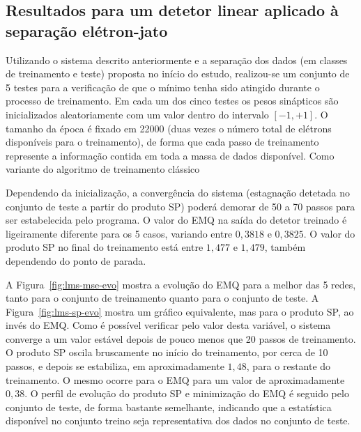 \subsection{Resultados para um detetor linear aplicado à separação
e\-lé\-tron-jato}

Utilizando o sistema descrito anteriormente e a separação dos dados (em
classes de treinamento e teste) proposta no início do estudo, realizou-se um
conjunto de 5 testes para a verificação de que o mínimo tenha sido atingido
durante o processo de treinamento. Em cada um dos cinco testes os pesos
sinápticos são inicializados aleatoriamente com um valor dentro do intervalo
$[-1, +1]$. O tamanho da época é fixado em 22000 (duas vezes o número total de
elétrons disponíveis para o treinamento), de forma que cada passo de
treinamento represente a informação contida em toda a massa de dados
disponível. Como variante do algoritmo de treinamento clássico

Dependendo da inicialização, a convergência do sistema (estagnação detetada no
conjunto de teste a partir do produto SP) poderá demorar de 50 a 70 passos
para ser estabelecida pelo programa. O valor do EMQ na saída do detetor
treinado é ligeiramente diferente para os 5 casos, variando entre $0,3818$ e
$0,3825$. O valor do produto SP no final do treinamento está entre $1,477$ e
$1,479$, também dependendo do ponto de parada.

A Figura~\ref{fig:lms-mse-evo} mostra a evolução do EMQ para a melhor das 5
redes, tanto para o conjunto de treinamento quanto para o conjunto de teste. A
Figura~\ref{fig:lms-sp-evo} mostra um gráfico equivalente, mas para o produto
SP, ao invés do EMQ. Como é possível verificar pelo valor desta variável, o
sistema converge a um valor estável depois de pouco menos que 20 passos de
treinamento. O produto SP oscila bruscamente no início do treinamento, por
cerca de 10 passos, e depois se estabiliza, em aproximadamente $1,48$, para o
restante do treinamento. O mesmo ocorre para o EMQ para um valor de
aproximadamente $0,38$. O perfil de evolução do produto SP e minimização do
EMQ é seguido pelo conjunto de teste, de forma bastante semelhante, indicando
que a estatística disponível no conjunto treino seja representativa dos dados
no conjunto de teste.


